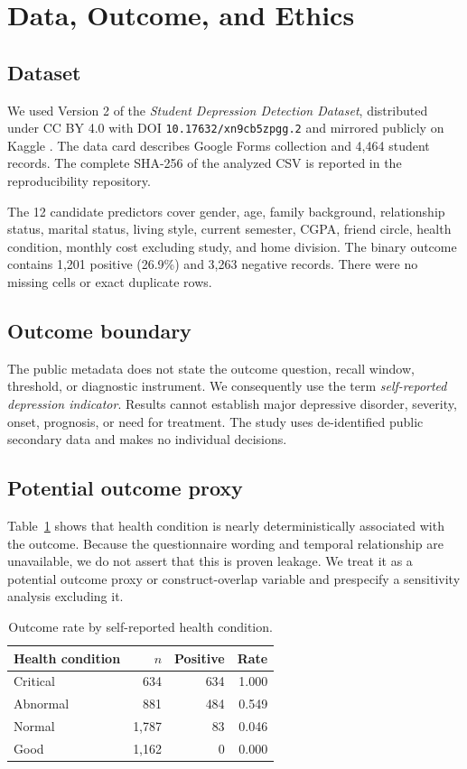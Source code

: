 \documentclass[conference]{IEEEtran}
\begin{document}
\section{Data, Outcome, and Ethics}
\subsection{Dataset}
We used Version 2 of the \emph{Student Depression Detection Dataset}, distributed under CC BY 4.0 with DOI \texttt{10.17632/xn9cb5zpgg.2} and mirrored publicly on Kaggle \cite{haque2026dataset}. The data card describes Google Forms collection and 4,464 student records. The complete SHA-256 of the analyzed CSV is reported in the reproducibility repository.

The 12 candidate predictors cover gender, age, family background, relationship status, marital status, living style, current semester, CGPA, friend circle, health condition, monthly cost excluding study, and home division. The binary outcome contains 1,201 positive (26.9\%) and 3,263 negative records. There were no missing cells or exact duplicate rows.

\subsection{Outcome boundary}
The public metadata does not state the outcome question, recall window, threshold, or diagnostic instrument. We consequently use the term \emph{self-reported depression indicator}. Results cannot establish major depressive disorder, severity, onset, prognosis, or need for treatment. The study uses de-identified public secondary data and makes no individual decisions.

\subsection{Potential outcome proxy}
Table~\ref{tab:health} shows that health condition is nearly deterministically associated with the outcome. Because the questionnaire wording and temporal relationship are unavailable, we do not assert that this is proven leakage. We treat it as a potential outcome proxy or construct-overlap variable and prespecify a sensitivity analysis excluding it.

\begin{table}[t]
\centering
\caption{Outcome rate by self-reported health condition.}
\label{tab:health}
\begin{tabular}{lrrr}
\toprule
Health condition & $n$ & Positive & Rate \\
\midrule
Critical & 634 & 634 & 1.000 \\
Abnormal & 881 & 484 & 0.549 \\
Normal & 1,787 & 83 & 0.046 \\
Good & 1,162 & 0 & 0.000 \\
\bottomrule
\end{tabular}
\end{table}
\end{document}
